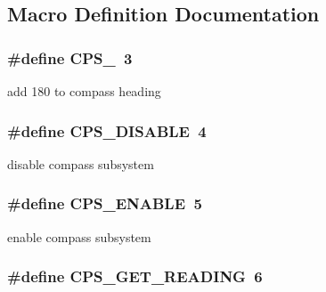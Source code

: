 \subsection{Macro Definition Documentation}
\hypertarget{group__compass__commands_gafb06fe5e8531750fd730129beb1c85a9}{
\subsubsection[{C\-P\-S\-\_\-180}]{\setlength{\rightskip}{0pt plus 5cm}\#define C\-P\-S\-\_~3}}\label{group__compass__commands_gafb06fe5e8531750fd730129beb1c85a9}
add 180 to compass heading \hypertarget{group__compass__commands_gacc391ac5638a636771f016cfa1991d4d}{
\subsubsection[{C\-P\-S\-\_\-\-D\-I\-S\-A\-B\-L\-E}]{\setlength{\rightskip}{0pt plus 5cm}\#define C\-P\-S\-\_\-\-D\-I\-S\-A\-B\-L\-E~4}}\label{group__compass__commands_gacc391ac5638a636771f016cfa1991d4d}
disable compass subsystem \hypertarget{group__compass__commands_ga7991975b6f6c2c5c731bafe810ebcab8}{
\subsubsection[{C\-P\-S\-\_\-\-E\-N\-A\-B\-L\-E}]{\setlength{\rightskip}{0pt plus 5cm}\#define C\-P\-S\-\_\-\-E\-N\-A\-B\-L\-E~5}}\label{group__compass__commands_ga7991975b6f6c2c5c731bafe810ebcab8}
enable compass subsystem \hypertarget{group__compass__commands_ga5804a250179671cacf4c9b1b4572d8de}{
\subsubsection[{C\-P\-S\-\_\-\-G\-E\-T\-\_\-\-R\-E\-A\-D\-I\-N\-G}]{\setlength{\rightskip}{0pt plus 5cm}\#define C\-P\-S\-\_\-\-G\-E\-T\-\_\-\-R\-E\-A\-D\-I\-N\-G~6}}\label{group__compass__commands_ga5804a250179671cacf4c9b1b4572d8de}
